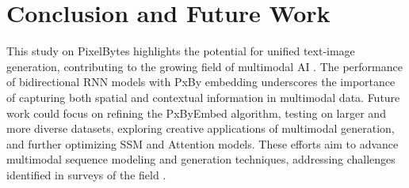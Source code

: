 \documentclass[10pt,a4paper]{article}
\begin{document}
\section{Conclusion and Future Work}

This study on PixelBytes highlights the potential for unified text-image generation, contributing to the growing field of multimodal AI \cite{baltrusaitis2019multimodal}. The performance of bidirectional RNN models with PxBy embedding underscores the importance of capturing both spatial and contextual information in multimodal data. Future work could focus on refining the PxByEmbed algorithm, testing on larger and more diverse datasets, exploring creative applications of multimodal generation, and further optimizing SSM and Attention models. These efforts aim to advance multimodal sequence modeling and generation techniques, addressing challenges identified in surveys of the field \cite{lin2014microsoft}.



\end{document}
